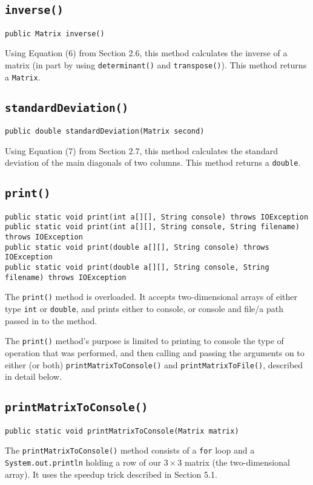 \documentclass[12pt]{article}
\begin{document}
\subsection{\texttt{inverse()}}
\begin{verbatim}
public Matrix inverse()
\end{verbatim}
Using Equation (6) from Section 2.6, this method calculates the inverse of a matrix (in part by using \texttt{determinant()} and \texttt{transpose()}). This method returns a \texttt{Matrix}.

\subsection{\texttt{standardDeviation()}}
\begin{verbatim}
public double standardDeviation(Matrix second)
\end{verbatim}
Using Equation (7) from Section 2.7, this method calculates the standard deviation of the main diagonals of two columns. This method returns a \texttt{double}.

\subsection{\texttt{print()}}
\begin{verbatim}
public static void print(int a[][], String console) throws IOException
public static void print(int a[][], String console, String filename) throws IOException
public static void print(double a[][], String console) throws IOException
public static void print(double a[][], String console, String filename) throws IOException
\end{verbatim}
The \texttt{print()} method is overloaded. It accepts two-dimensional arrays of either type \texttt{int} or \texttt{double}, and prints either to console, or console and file/a path passed in to the method.
\par The \texttt{print()} method's purpose is limited to printing to console the type of operation that was performed, and then calling and passing the arguments on to either (or both) \texttt{printMatrixToConsole()} and \texttt{printMatrixToFile()}, described in detail below.

\subsection{\texttt{printMatrixToConsole()}}
\begin{verbatim}
public static void printMatrixToConsole(Matrix matrix)
\end{verbatim}
The \texttt{printMatrixToConsole()} method consists of a \texttt{for} loop and a \texttt{System.out.println} holding a row of our $3\times3$ matrix (the two-dimensional array). It uses the speedup trick described in Section 5.1.
\end{document}
